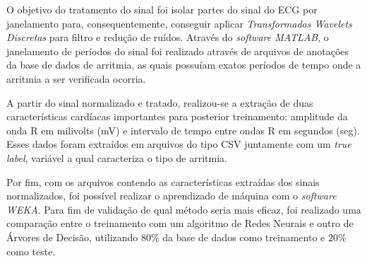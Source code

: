 \documentclass[conference]{IEEEtran}
\begin{document}
O objetivo do tratamento do sinal foi isolar partes do sinal do ECG por janelamento para, consequentemente, conseguir aplicar \textit{Transformadas Wavelets Discretas} para filtro e redução de ruídos. Através do \textit{software MATLAB}, o janelamento de períodos do sinal foi realizado através de arquivos de anotações da base de dados de arritmia, as quais possuíam exatos períodos de tempo onde a arritmia a ser verificada ocorria.

A partir do sinal normalizado e tratado, realizou-se a extração de duas características cardíacas importantes para posterior treinamento: amplitude da onda R em milivolts (mV) e intervalo de tempo entre ondas R em segundos (seg). Esses dados foram extraídos em arquivos do tipo CSV juntamente com um \textit{true label}, variável a qual caracteriza o tipo de arritmia.

Por fim, com os arquivos contendo as características extraídas dos sinais normalizados, foi possível realizar o aprendizado de máquina com o \textit{software WEKA}. Para fim de validação de qual método seria mais eficaz, foi realizado uma comparação entre o treinamento com um algoritmo de Redes Neurais e outro de Árvores de Decisão, utilizando 80\% da base de dados como treinamento e 20\% como teste.

%
\end{document}
